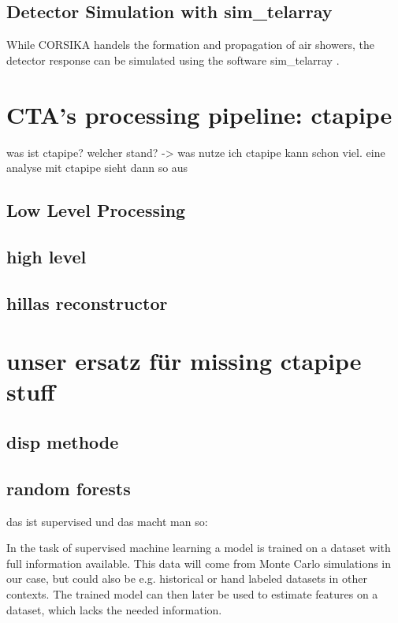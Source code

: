 \subsection{Detector Simulation with sim\_telarray}
While CORSIKA handels the formation and propagation of air showers,
the detector response can be simulated using the software
sim\_telarray \cite{BERNLOHR2008149}.

\section{CTA's processing pipeline: ctapipe}
was ist ctapipe?
welcher stand? -> was nutze ich
ctapipe kann schon viel.
eine analyse mit ctapipe sieht dann so aus
\subsection{Low Level Processing}

\subsection{high level}
\subsection{hillas reconstructor}

\section{unser ersatz für missing ctapipe stuff}
\subsection{disp methode}
\subsection{random forests}
das ist supervised und das macht man so:

In the task of supervised machine learning a model is trained on a
dataset with full information available.
This data will come from Monte Carlo simulations in our case, but
could also be e.g. historical or hand labeled datasets in other contexts.
The trained model can then later be used to estimate features on a dataset, which
lacks the needed information.

